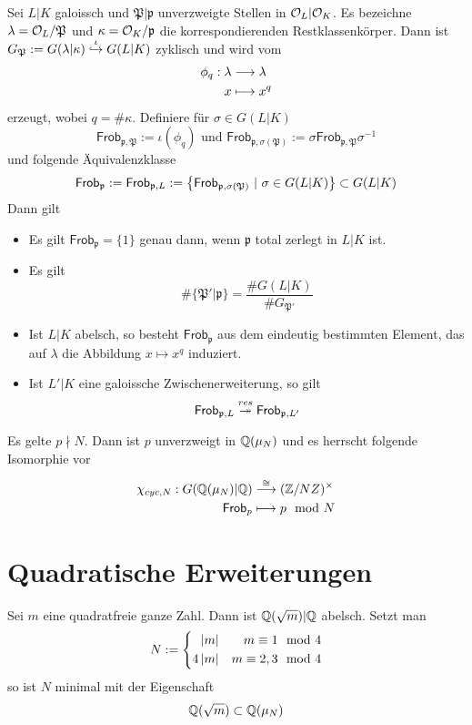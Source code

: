 \documentclass{book}
\renewcommand{\i}{^{-1}}
\newcommand{\pf}{\mathfrak{p}}
\newcommand{\Pf}{\mathfrak{P}}
\newcommand{\Frob}{\textsf{Frob}}
\begin{document}
\Prop{}
Sei $L|K$ galoissch und $\Pf|\pf$ unverzweigte Stellen in $\mathcal{O}_L|\mathcal{O}_K$. Es bezeichne $\lambda = \O_L / \Pf$ und $\kappa = \O_K /\pf$ die korrespondierenden Restklassenkörper. Dann ist $G_\Pf := G(\lambda | \kappa) \inj{\iota} G(L|K)$ zyklisch und wird vom 
\begin{align*}
\phi_q : \lambda & \overset{}{\longrightarrow} \lambda\\
x &\longmapsto x^q 
\end{align*}
erzeugt, wobei $q = \# \kappa$. Definiere für $\sigma \in G(L|K)$
\[ \Frob_{\pf, \Pf} := \iota(\phi_q) \text{ und } \Frob_{\pf, \sigma(\Pf)} := \sigma \Frob_{\pf, \Pf} \sigma\i \]
und folgende Äquivalenzklasse
\[ \Frob_\pf :=\Frob_{\pf,L} := \set{ \Frob_{\pf, \sigma(\Pf)} }{\sigma \in G(L|K)} \subset G(L|K) \]
Dann gilt
\begin{itemize}
	\item Es gilt $\Frob_\pf = \{1\}$ genau dann, wenn $\pf$ total zerlegt in $L|K$ ist.
	\item Es gilt
	\[ \#\{ \Pf' | \pf \} = \frac{\#G(L|K)}{\#G_{\Pf'}} \]
	\item Ist $L|K$ abelsch, so besteht $\Frob_\pf$ aus dem eindeutig bestimmten Element, das auf $\lambda$ die Abbildung $x \mapsto x^q$ induziert.
	\item Ist $L'|K$ eine galoissche Zwischenerweiterung, so gilt
	\[ \Frob_{\pf, L} \surj{res} \Frob_{\pf,L'} \]
\end{itemize}

\Prop{}
Es gelte $p\nmid N$. Dann ist $p$ unverzweigt in $\mathbb{Q}(\mu_N)$ und es herrscht folgende Isomorphie vor
\begin{align*}
\chi_{cyc, N} : G(\Q(\mu_N) | \Q) & \Pfeil{\isom{}} (\Z/NZ)^\times\\
\Frob_p & \longmapsto p \mod{N}
\end{align*}

\section{Quadratische Erweiterungen}
\Prop{}
Sei $m$ eine quadratfreie ganze Zahl. Dann ist $\mathbb{Q}(\sqrt{m}) | \mathbb{Q}$ abelsch. Setzt man
\begin{align*}
N := 
\left\lbrace\begin{aligned}
\left|m\right| && m \equiv 1 \mod{4}\\
4\left|m\right| && m \equiv 2,3 \mod{4}
\end{aligned}\right.
\end{align*}
so ist $N$ minimal mit der Eigenschaft
\[ \mathbb{Q}(\sqrt{m}) \subset \mathbb{Q}(\mu_N) \]
\end{document}
